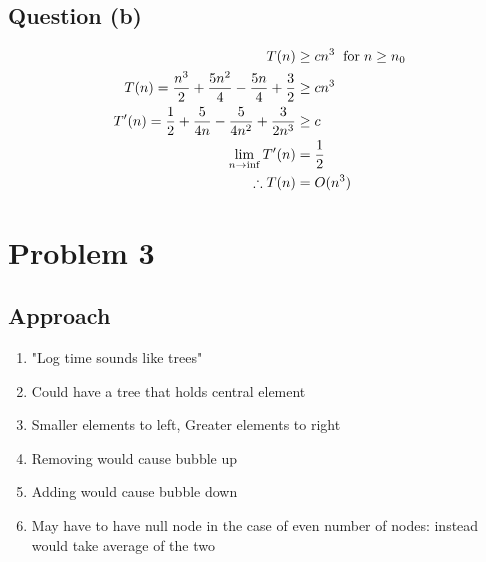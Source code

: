\documentclass{article}
\begin{document}
\subsection{Question (b)}
\begin{align*}
    T(n) &\geq cn^3 \hspace{2mm} \text{for} \hspace{1mm} n \geq n_0\\
    T(n) = \frac{n^3}{2}
    + \frac{5n^2}{4}
    - \frac{5n}{4}
    + \frac{3}{2}
    &\geq cn^3 \\
    T^{\prime}(n) = \frac{1}{2}
    + \frac{5}{4n}
    - \frac{5}{4n^2}
    + \frac{3}{2n^3}
    &\geq c \\
    \lim_{n \to \inf} T^{\prime}(n) &= \frac{1}{2} \\
    \therefore
    T(n) &= O(n^3)
\end{align*}

\section{Problem 3}
\subsection{Approach}
\begin{enumerate}
    \item "Log time sounds like trees"
    \item Could have a tree that holds central element
    \item Smaller elements to left, Greater elements to right
    \item Removing would cause bubble up
    \item Adding would cause bubble down
    \item May have to have null node in the case of even number of nodes: instead would take average of the two
\end{enumerate}
\end{document}
